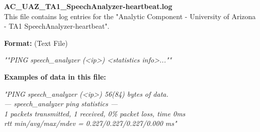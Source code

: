 \begin{description}
\begin{addmargin}[0em]{0em}
    \label{AC_UAZ_TA1_SpeechAnalyzer-heartbeat.log}
    \begin{addmargin}[1em]{0em} %
        \textbf{AC\_UAZ\_TA1\_SpeechAnalyzer-heartbeat.log}\\
        This file contains log entries for the "Analytic Component - University of Arizona - TA1 SpeechAnalyzer-heartbeat".
        \begin{addmargin}[1em]{0em}
            \textbf{Format:} (Text File)
            \begin{addmargin}[1em]{0em}
                \textit{""PING speech\_analyzer (<ip>) <statistics info>...""}
            \end{addmargin}
        \end{addmargin}
        \begin{addmargin}[1em]{0em}
            \textbf{Examples of data in this file:}
            \begin{addmargin}[1em]{0em}\textit{"PING speech\_analyzer (<ip>) 56(84) bytes of data.\\
                --- speech\_analyzer ping statistics ---\\
                1 packets transmitted, 1 received, 0\% packet loss, time 0ms\\
                rtt min/avg/max/mdev = 0.227/0.227/0.227/0.000 ms"}
            \end{addmargin}
        \end{addmargin}
    \end{addmargin} %
    \textbf{\\}


\end{addmargin}
\end{description}
